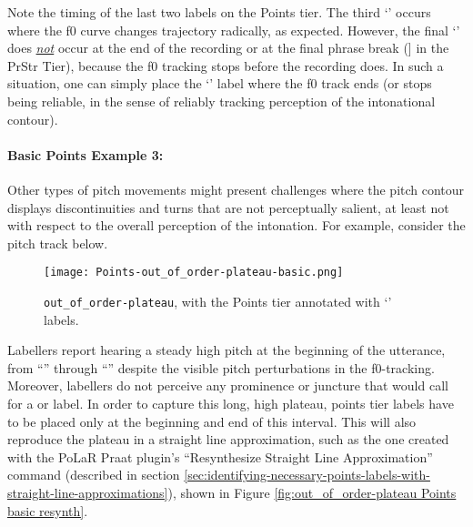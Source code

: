 Note the timing of the last two labels on the Points tier. The third ‘’ occurs where the f0 curve changes trajectory radically, as expected. However, the final ‘’ does \textit{\uline{not}} occur at the end of the recording or at the final phrase break (] in the PrStr Tier), because the f0 tracking stops before the recording does. In such a situation, one can simply place the ‘’ label where the f0 track ends (or stops being reliable, in the sense of reliably tracking perception of the intonational contour).

\paragraph{Basic Points Example 3:\label{basic-points-example-3}}

Other types of pitch movements might present challenges where the pitch contour displays discontinuities and turns that are not perceptually salient, at least not with respect to the overall perception of the intonation. For example, consider the pitch track below.

\begin{figure}[H]
\centering
%
\texttt{[image: Points-out\_of\_order-plateau-basic.png]}
%
\caption{\texttt{out\_of\_order-plateau}, with the Points tier annotated with ‘’ labels.%
\label{fig:out_of_order-plateau Points basic}%
%
}
\end{figure}

Labellers report hearing a steady high pitch at the beginning of the utterance, from “” through “” despite the  visible pitch perturbations in the f0-tracking. Moreover, labellers do not perceive any prominence or juncture that would call for a \textlabel{*} or \textlabel{]} label. In order to capture this long, high plateau, points tier labels have to be placed only at the beginning and end  of this interval. This will also reproduce the plateau in a straight line approximation, such as the one created with the PoLaR Praat plugin’s “Resynthesize Straight Line Approximation” command (described in section \ref{sec:identifying-necessary-points-labels-with-straight-line-approximations}), shown in Figure \ref{fig:out_of_order-plateau Points basic resynth}.

